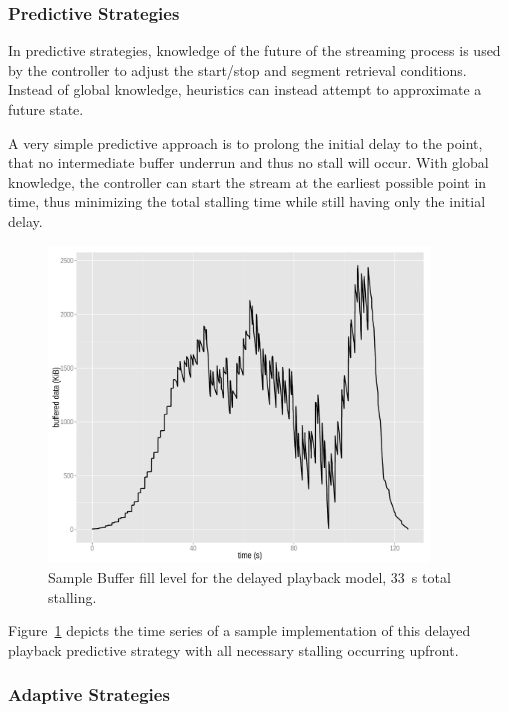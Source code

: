 \subsubsection{Predictive Strategies}

In predictive strategies, knowledge of the future of the streaming process is used by the controller to adjust the start/stop and segment retrieval conditions. Instead of global knowledge, heuristics can instead attempt to approximate a future state.

A very simple predictive approach is to prolong the initial delay to the point, that no intermediate buffer underrun and thus no stall will occur. With global knowledge, the controller can start the stream at the earliest possible point in time, thus minimizing the total stalling time while still having only the initial delay.

\begin{figure}[htb]
    \centering
    \includegraphics[width=0.9\textwidth]{images/R-bufferlevel-startdelay.pdf}
    \caption{Sample Buffer fill level for the delayed playback model, \SI{33}{\second} total stalling.}
    \label{c3:fig:bufferlevel-startdelay}
\end{figure}

Figure~\ref{c3:fig:bufferlevel-startdelay} depicts the time series of a sample implementation of this delayed playback predictive strategy with all necessary stalling occurring upfront.


\subsubsection{Adaptive Strategies}

